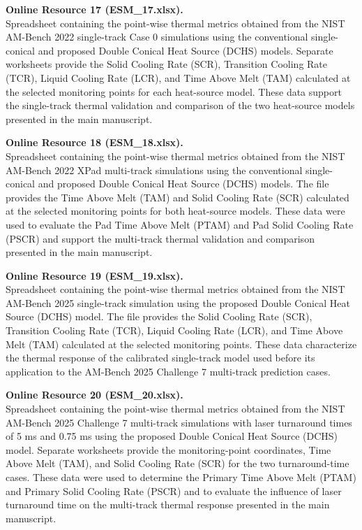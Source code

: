 \documentclass[11pt]{article}
\begin{document}
\medskip

\textbf{Online Resource 17 (ESM\_17.xlsx).}\\
Spreadsheet containing the point-wise thermal metrics obtained from the
NIST AM-Bench 2022 single-track Case 0 simulations using the conventional
single-conical and proposed Double Conical Heat Source (DCHS) models.
Separate worksheets provide the Solid Cooling Rate (SCR), Transition
Cooling Rate (TCR), Liquid Cooling Rate (LCR), and Time Above Melt (TAM)
calculated at the selected monitoring points for each heat-source model.
These data support the single-track thermal validation and comparison of
the two heat-source models presented in the main manuscript.

\medskip

\textbf{Online Resource 18 (ESM\_18.xlsx).}\\
Spreadsheet containing the point-wise thermal metrics obtained from the
NIST AM-Bench 2022 XPad multi-track simulations using the conventional
single-conical and proposed Double Conical Heat Source (DCHS) models.
The file provides the Time Above Melt (TAM) and Solid Cooling Rate (SCR)
calculated at the selected monitoring points for both heat-source models.
These data were used to evaluate the Pad Time Above Melt (PTAM) and Pad
Solid Cooling Rate (PSCR) and support the multi-track thermal validation
and comparison presented in the main manuscript.

\medskip

\textbf{Online Resource 19 (ESM\_19.xlsx).}\\
Spreadsheet containing the point-wise thermal metrics obtained from the
NIST AM-Bench 2025 single-track simulation using the proposed Double
Conical Heat Source (DCHS) model. The file provides the Solid Cooling
Rate (SCR), Transition Cooling Rate (TCR), Liquid Cooling Rate (LCR),
and Time Above Melt (TAM) calculated at the selected monitoring points.
These data characterize the thermal response of the calibrated
single-track model used before its application to the AM-Bench 2025
Challenge 7 multi-track prediction cases.

\medskip

\textbf{Online Resource 20 (ESM\_20.xlsx).}\\
Spreadsheet containing the point-wise thermal metrics obtained from the
NIST AM-Bench 2025 Challenge 7 multi-track simulations with laser turnaround
times of 5 ms and 0.75 ms using the proposed Double Conical Heat Source
(DCHS) model. Separate worksheets provide the monitoring-point coordinates,
Time Above Melt (TAM), and Solid Cooling Rate (SCR) for the two turnaround-time
cases. These data were used to determine the Primary Time Above Melt (PTAM)
and Primary Solid Cooling Rate (PSCR) and to evaluate the influence of laser
turnaround time on the multi-track thermal response presented in the main
manuscript.
\end{document}
